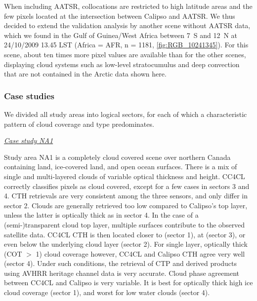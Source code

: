 When including AATSR, collocations are restricted to high latitude areas and the few pixels located at the intersection between Calipso and AATSR. We thus decided to extend the validation analysis by another scene without AATSR data, which we found in the Gulf of Guinea/West Africa between 7\textdegree\ S and 12\textdegree\ N at 24/10/2009 13.45 LST (Africa = AFR, n = 1181, \cref{fig:RGB_10241345}). For this scene, about ten times more pixel values are available than for the other scenes, displaying cloud systems such as low-level stratocumulus and deep convection that are not contained in the Arctic data shown here.

\subsubsection{Case studies}

We divided all study areas into logical sectors, for each of which a characteristic pattern of cloud coverage and type predominates. 

\vspace{5mm}\underline{\textit{Case study NA1}}\vspace{2mm}

Study area NA1 is a completely cloud covered scene over northern Canada containing land, ice-covered land, and open ocean surfaces. There is a mix of single and multi-layered clouds of variable optical thickness and height. 
CC4CL correctly classifies pixels as cloud covered, except for a few cases in sectors 3 and 4. CTH retrievals are very consistent among the three sensors, and only differ in sector 2. Clouds are generally retrieved too low compared to Calipso's top layer, unless the latter is optically thick as in sector 4. In the case of a (semi-)transparent cloud top layer, multiple surfaces contribute to the observed satellite data. CC4CL CTH is then located closer to (sector 1), at (sector 3), or even below the underlying cloud layer (sector 2). For single layer, optically thick (COT $>$ 1) cloud coverage however, CC4CL and Calipso CTH agree very well (sector 4). Under such conditions, the retrieval of CTP and derived products using AVHRR heritage channel data is very accurate. Cloud phase agreement between CC4CL and Calipso is very variable. It is best for optically thick high ice cloud coverage (sector 1), and worst for low water clouds (sector 4).

